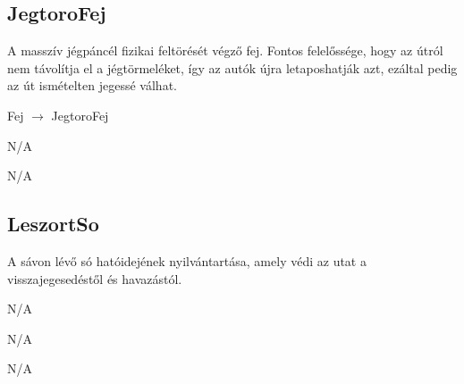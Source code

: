 \subsection{JegtoroFej}
\begin{class-template-responsibility}
    A masszív jégpáncél fizikai feltörését végző fej. Fontos felelőssége, hogy az útról nem távolítja el a jégtörmeléket, így az autók újra letaposhatják azt, ezáltal pedig az út ismételten jegessé válhat. 
\end{class-template-responsibility}
\begin{class-template-baseclass}
    Fej $\rightarrow$ JegtoroFej
\end{class-template-baseclass}
\begin{class-template-interface}
    N/A
\end{class-template-interface}
\begin{class-template-attribute}
    N/A
\end{class-template-attribute}
\begin{class-template-method}
\end{class-template-method}

\subsection{LeszortSo}
\begin{class-template-responsibility}
    A sávon lévő só hatóidejének nyilvántartása, amely védi az utat a visszajegesedéstől és havazástól.
\end{class-template-responsibility}
\begin{class-template-baseclass}
    N/A
\end{class-template-baseclass}
\begin{class-template-interface}
    N/A
\end{class-template-interface}
\begin{class-template-attribute}
\end{class-template-attribute}
\begin{class-template-method}
    N/A
\end{class-template-method}

